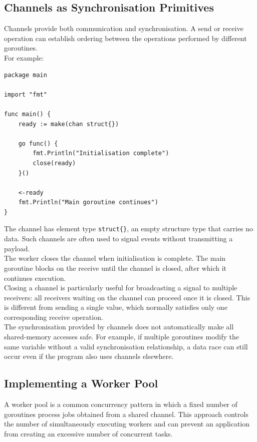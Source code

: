 \subsection{Channels as Synchronisation Primitives}

Channels provide both communication and synchronisation. A send or receive operation can establish ordering between the operations performed by different goroutines.\\

For example:

\begin{lstlisting}
package main

import "fmt"

func main() {
    ready := make(chan struct{})

    go func() {
        fmt.Println("Initialisation complete")
        close(ready)
    }()

    <-ready
    fmt.Println("Main goroutine continues")
}
\end{lstlisting}

The channel has element type \texttt{struct\{\}}, an empty structure type that carries no data. Such channels are often used to signal events without transmitting a payload.\\

The worker closes the channel when initialisation is complete. The main goroutine blocks on the receive until the channel is closed, after which it continues execution.\\

Closing a channel is particularly useful for broadcasting a signal to multiple receivers: all receivers waiting on the channel can proceed once it is closed. This is different from sending a single value, which normally satisfies only one corresponding receive operation.\\

The synchronisation provided by channels does not automatically make all shared-memory accesses safe. For example, if multiple goroutines modify the same variable without a valid synchronisation relationship, a data race can still occur even if the program also uses channels elsewhere.

\subsection{Implementing a Worker Pool}

A worker pool is a common concurrency pattern in which a fixed number of goroutines process jobs obtained from a shared channel. This approach controls the number of simultaneously executing workers and can prevent an application from creating an excessive number of concurrent tasks.\\

